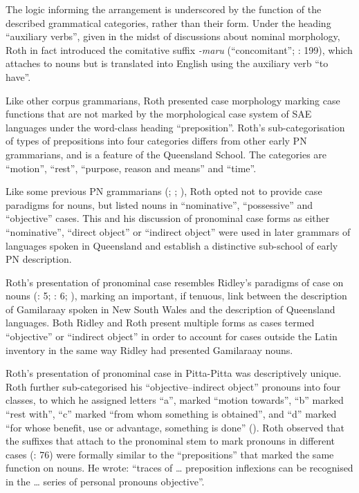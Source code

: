 The logic informing the arrangement is underscored by the function of the described grammatical categories, rather than their form. Under the heading “auxiliary verbs'', given in the midst of discussions about nominal morphology, Roth in fact introduced the comitative suffix \textit{-maru} (“concomitant”; \citealt{blake_pitta_1979}: 199), which attaches to nouns but is translated into English using the auxiliary verb “to have''.

Like other corpus grammarians, Roth presented case morphology marking case functions that are not marked by the morphological case system of SAE languages under the word-class heading “preposition''. Roth’s sub-categorisation of types of prepositions into four categories differs from other early PN grammarians, and is a feature of the Queensland School. The categories are “motion'', “rest'', “purpose, reason and means” and “time”.

Like some previous PN grammarians (\citealt{meyer_vocabulary_1843}; \citealt{schurmann_letter_1844}; \citealt{livingstone_grammar_1892}), Roth opted not to provide case paradigms for nouns, but listed nouns in “nominative'', “possessive” and “objective” cases. This and his discussion of pronominal case forms as either “nominative'', “direct object” or “indirect object'' were used in later grammars of languages spoken in Queensland and establish a distinctive sub-school of early PN description.

Roth’s presentation of pronominal case resembles Ridley’s paradigms of case on nouns (\citeyear{ridley_kamilaroi_1866}: 5; \citeyear{ridley_kamilaroi_1875}: 6; ), marking an important, if tenuous, link between the description of Gamilaraay spoken in New South Wales and the description of Queensland languages. Both Ridley and Roth present multiple forms as cases termed “objective” or “indirect object” in order to account for cases outside the Latin inventory in the same way Ridley had presented Gamilaraay nouns.

Roth’s presentation of pronominal case in Pitta-Pitta was descriptively unique. Roth further sub-categorised his “objective–indirect object” pronouns into four classes, to which he assigned letters “a'', marked “motion towards'', “b” marked “rest with'', “c” marked “from whom something is obtained'', and “d” marked “for whose benefit, use or advantage, something is done” (). Roth observed that the suffixes that attach to the pronominal stem to mark pronouns in different cases (\citealt{blake_pitta-pitta_1971}: 76) were formally similar to the “prepositions” that marked the same function on nouns. He wrote: “traces of … preposition inflexions can be recognised in the … series of personal pronouns objective”.


